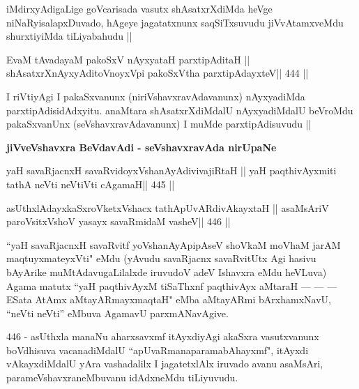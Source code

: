\begin{artha}
iMdirxyAdigaLige goVcarisada vasutx shAsatxrXdiMda heVge
niNaRyisalapxDuvado, hAgeye jagatatxnunx saqSiTxsuvudu jiVvAtamxveMdu
shurxtiyiMda tiLiyabahudu ||
\end{artha}


\begin{shl}
EvaM tAvadayaM pakoSxV nAyxyataH parxtipAditaH ||
shAsatxrXnAyxyAditoV\s noyxV\s pi pakoSxV\s tha parxtipAdayxteV\hfill || 444 ||
\end{shl}

\begin{artha}
I riVtiyAgi I pakaSxvanunx (niriVshavxravAdavanunx) nAyxyadiMda
parxtipAdisidAdxyitu. anaMtara shAsatxrXdiMdalU nAyxyadiMdalU beVroMdu
pakaSxvanUnx (seVshavxravAdavanunx) I muMde parxtipAdisuvudu ||
\end{artha}

\medskip
\centerline{\Large{\textbf{jiVveVshavxra BeVdavAdi - seVshavxravAda nirUpaNe}}}

\medskip


\begin{shl}
yaH savaRjacnxH savaRvidoyxV\s shanAyAdivivajiRtaH ||
yaH paqthivAyxmiti tathA neVti neVtiVti cA\s\s gamaH\hfill || 445 ||
\end{shl}

\begin{shl}
asUthxlAdayxkaSxroVketxVshacx tathA\s pUvARdivAkayxtaH ||
asaMsAriV paroV\s sitxVshoV yasayx savaRmidaM vasheV\hfill || 446 ||
\end{shl}

\begin{artha}
``yaH savaRjacnxH savaRvitf yoV\s shanAyApipAseV shoVkaM moVhaM
  jarAM maqtuyxmateyxVti" eMdu (yAvudu savaRjacnx savaRvitUtx Agi
  hasivu bAyArike muMtAdavugaLilalxde iruvudoV adeV Ishavxra eMdu
  heVLuva) Agama matutx ``yaH paqthivAyxM tiSaThxnf paqthivAyx aMtaraH
  --- --- --- ESata AtAmx aMtayARmayxmaqtaH" eMba
  aMtayARmi bArxhamxNavU, ``neVti neVti'' eMbuva AgamavU
  parxmANavAgive. 
  
  446 - asUthxla manaNu aharxsavxmf itAyxdiyAgi akaSxra
  vasutxvanunx boVdhisuva vacanadiMdalU ``apUvaRmanaparamabAhayxmf", 
  itAyxdi vAkayxdiMdalU yAra vashadalilx I jagatetxlAlx
  iruvado avanu asaMsAri, parameVshavxraneMbuvanu idAdxneMdu tiLiyuvudu.
\end{artha}

